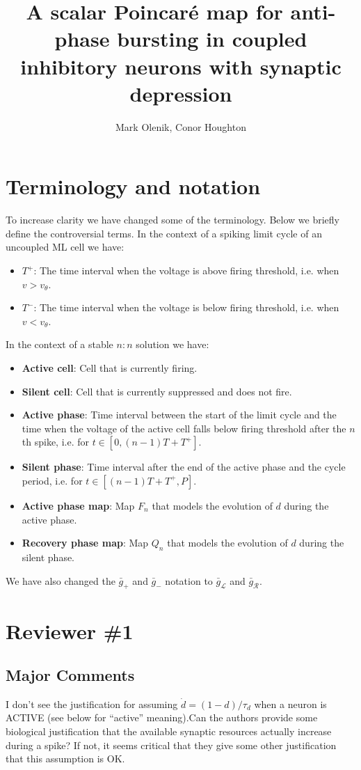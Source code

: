 \documentclass{ar2rc}
\title{A scalar Poincaré map for anti-phase bursting in coupled inhibitory neurons with synaptic depression}
\author{Mark Olenik, Conor Houghton}
\begin{document}
\maketitle

\section{Terminology and notation}
To increase clarity we have changed some of the terminology.
Below we briefly define the controversial terms.
In the context of a spiking limit cycle of an uncoupled ML cell we have:
\begin{itemize}
	\item $T^{+}$: The time interval when the voltage is above firing threshold, i.e. when $v>v_{\theta}$.
	\item $T^{-}$: The time interval when the voltage is below firing threshold, i.e. when $v<v_{\theta}$.
\end{itemize}
In the context of a stable $n:n$ solution we have:
\begin{itemize}
	\item \textbf{Active cell}: Cell that is currently firing.
	\item \textbf{Silent cell}: Cell that is currently suppressed and does not fire.
	\item \textbf{Active phase}: Time interval between the start of the limit cycle and the time when the voltage of the active cell falls below firing threshold after the $n$th spike, i.e. for $t \in \left[0, (n-1)T + T^{+}\right]$.
	\item \textbf{Silent phase}: Time interval after the end of the active phase and the cycle period, i.e. for $t \in \left[(n-1)T + T^{+}, P\right]$.
	\item \textbf{Active phase map}: Map $F_{n}$ that models the evolution of $d$ during the active phase.
	\item \textbf{Recovery phase map}: Map $Q_{n}$ that models the evolution of $d$ during the silent phase.
\end{itemize}
We have also changed the $\bar g_{+}$ and $\bar g_{-}$ notation to $\bar g_{\mathcal{L}}$ and $\bar g_{\mathcal{R}}$.


\section{Reviewer \#1}

\subsection{Major Comments}
\RC
I don't see the justification for assuming $\dot d=(1-d)/\tau_{d}$ when a neuron is ACTIVE (see below for ``active'' meaning).Can the authors provide some biological justification that the available synaptic resources actually increase during a spike? If not, it seems critical that they give some other justification that this assumption is OK.
\end{document}
